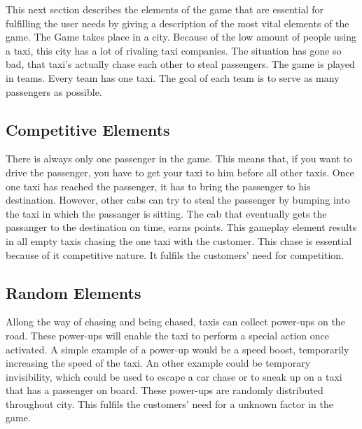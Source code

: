 

This next section describes the elements of the game that are essential for fulfilling the user needs by giving a description of the most vital elements of the game. The Game takes place in a city. Because of the low amount of people using a taxi, this city has a lot of rivaling taxi companies. The situation has gone so bad, that taxi's actually chase each other to steal passengers. The game is played in teams. Every team has one taxi. The goal of each team is to serve as many passengers as possible.


\subsection{Competitive Elements}
There is always only one passenger in the game. This means that, if you want to drive the passenger, you have to get your taxi to him before all other taxis. Once one taxi has reached the passenger, it has to bring the passenger to his destination. However, other cabs can try to steal the passenger by bumping into the taxi in which the passanger is sitting. The cab that eventually gets the passanger to the destination on time, earns points. This gameplay element results in all empty taxis chasing the one taxi with the customer. This chase is essential because of it competitive nature. It fulfils the customers' need for competition. 

\subsection{Random Elements}

Allong the way of chasing and being chased, taxis can collect power-ups on the road. These power-ups will enable the taxi to perform a special action once activated. A simple example of a power-up would be a speed boost, temporarily increasing the speed of the taxi. An other example could be temporary invisibility, which could be used to escape a car chase or to sneak up on a taxi that has a passenger on board. These power-ups are randomly distributed throughout city. This fulfils the customers' need for a unknown factor in the game. 


